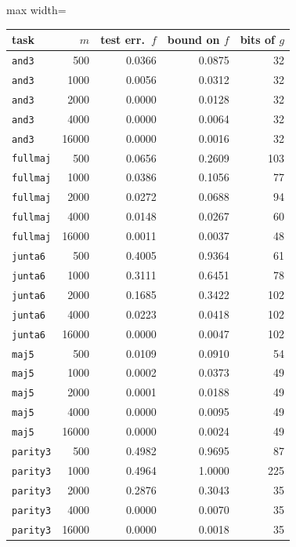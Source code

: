 \begin{table}[t]
\centering\small
\begin{adjustbox}{max width=\linewidth}\begin{tabular}{l r r r r}
\toprule
task & $m$ & test err.\ $f$ & bound on $f$ & bits of $g$ \\
\midrule
\texttt{and3} & 500 & 0.0366 & 0.0875 & 32 \\
\texttt{and3} & 1000 & 0.0056 & 0.0312 & 32 \\
\texttt{and3} & 2000 & 0.0000 & 0.0128 & 32 \\
\texttt{and3} & 4000 & 0.0000 & 0.0064 & 32 \\
\texttt{and3} & 16000 & 0.0000 & 0.0016 & 32 \\
\addlinespace[2pt]
\texttt{fullmaj} & 500 & 0.0656 & 0.2609 & 103 \\
\texttt{fullmaj} & 1000 & 0.0386 & 0.1056 & 77 \\
\texttt{fullmaj} & 2000 & 0.0272 & 0.0688 & 94 \\
\texttt{fullmaj} & 4000 & 0.0148 & 0.0267 & 60 \\
\texttt{fullmaj} & 16000 & 0.0011 & 0.0037 & 48 \\
\addlinespace[2pt]
\texttt{junta6} & 500 & 0.4005 & 0.9364 & 61 \\
\texttt{junta6} & 1000 & 0.3111 & 0.6451 & 78 \\
\texttt{junta6} & 2000 & 0.1685 & 0.3422 & 102 \\
\texttt{junta6} & 4000 & 0.0223 & 0.0418 & 102 \\
\texttt{junta6} & 16000 & 0.0000 & 0.0047 & 102 \\
\addlinespace[2pt]
\texttt{maj5} & 500 & 0.0109 & 0.0910 & 54 \\
\texttt{maj5} & 1000 & 0.0002 & 0.0373 & 49 \\
\texttt{maj5} & 2000 & 0.0001 & 0.0188 & 49 \\
\texttt{maj5} & 4000 & 0.0000 & 0.0095 & 49 \\
\texttt{maj5} & 16000 & 0.0000 & 0.0024 & 49 \\
\addlinespace[2pt]
\texttt{parity3} & 500 & 0.4982 & 0.9695 & 87 \\
\texttt{parity3} & 1000 & 0.4964 & 1.0000 & 225 \\
\texttt{parity3} & 2000 & 0.2876 & 0.3043 & 35 \\
\texttt{parity3} & 4000 & 0.0000 & 0.0070 & 35 \\
\texttt{parity3} & 16000 & 0.0000 & 0.0018 & 35 \\

\end{tabular}
\end{adjustbox}
\end{table}
